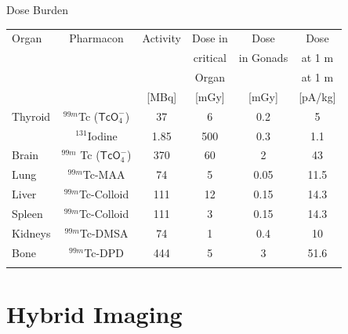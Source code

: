 \begin{frame}{Dose Burden}
    \begin{table}[ht]
        \begin{tabular}{l  c  c  c  c  c}
            \toprule{}
            Organ                        & Pharmacon                        & Activity & Dose	 in  & Dose      & Dose    \\
                                         &                                  &          & critical & in Gonads & at 1 m  \\
                                         &                                  &          & Organ    &           & at 1 m  \\
                                         &                                  & [MBq]    & [mGy]    & [mGy]     & [pA/kg] \\
            \rowcolor{faublue!10}		\midrule{}
            Thyroid                      & $^{99m}$Tc ($\mathsf{TcO}_4^-$)  & 37       & 6        & 0.2       & 5       \\
                                         & $^{131}$Iodine                   & 1.85     & 500      & 0.3       & 1.1     \\
            \rowcolor{faublue!10}Brain   & $^{99m}$ Tc ($\mathsf{TcO}_4^-$) & 370      & 60       & 2         & 43      \\
            Lung                         & $^{99m}$Tc-MAA                   & 74       & 5        & 0.05      & 11.5    \\
            \rowcolor{faublue!10}Liver   & $^{99m}$Tc-Colloid               & 111      & 12       & 0.15      & 14.3    \\
            Spleen                       & $^{99m}$Tc-Colloid               & 111      & 3        & 0.15      & 14.3    \\
            \rowcolor{faublue!10}	Kidneys & $^{99m}$Tc-DMSA                  & 74       & 1        & 0.4       & 10      \\
            Bone                         & $^{99m}$Tc-DPD                   & 444      & 5        & 3         & 51.6    \\
            \bottomrule{}
        \end{tabular}
    \end{table}
\end{frame}

\section{Hybrid Imaging}%
\label{sec:hybrid_imaging}


